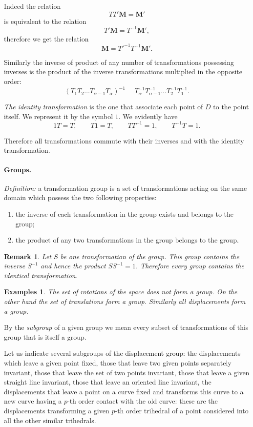 \documentclass[leqno,11pt]{book}
\numberwithin{equation}{chapter}
\theoremstyle{shape1}
\theoremstyle{shapesmall}
\newtheorem*{exs}{Examples}
\newtheorem*{rmk}{Remark}
\newenvironment{jsmall}{\vspace{9pt}\small}{\vspace{0pt}}
\begin{document}
Indeed the relation
\[
TT'\mathbf{M}=\mathbf{M}'
\]
is equivalent to the relation
\[
T'\mathbf{M}=T^{-1}\mathbf{M}',
\]
therefore we get the relation
\[
\mathbf{M}=T'^{-1}T^{-1}\mathbf{M}'.
\]

Similarly the inverse of product of any number of transformations possessing inverses is the product of the inverse transformations multiplied in the opposite order:
\[
(T_{1}T_{2}\dots T_{\alpha-1}T_{\alpha})^{-1}=T_{\alpha}^{-1}T_{\alpha-1}^{-1}\dots T_{2}^{-1}T_{1}^{-1}.
\]

\emph{The identity transformation} is the one that associate each point of $D$ to the point itself. We represent it by the symbol $1$. We evidently have
\[
1T=T,\qquad T1=T,\qquad TT^{-1}=1,\qquad T^{-1}T=1.
\]

{\small Therefore all transformations commute with their inverses and with the identity transformation.}


\paragraph{Groups.}
\label{sec:59}
\emph{Definition:} a transformation group is a set of transformations acting on the same domain which possess the two following properties:
\begin{enumerate}
\item the inverse of each transformation in the group exists and belongs to the group;
\item the product of any two transformations in the group belongs to the group.
\end{enumerate}

\begin{rmk}
  Let $S$ be one transformation of the group. This group contains the inverse $S^{-1}$ and hence the product $SS^{-1}=1$. Therefore every group contains the identical transformation.
\end{rmk}
\begin{exs}
  The set of rotations of the space does not form a group. On the other hand the set of translations form a group. Similarly all displacements form a group.
\end{exs}

By the \emph{subgroup} of a given group we mean every subset of transformations of this group that is itself a group.

\begin{jsmall}
  Let us indicate several subgroups of the displacement group: the displacements which leave a given point fixed, those that leave two given points separately invariant, those that leave the set of two points invariant, those that leave a given straight line invariant, those that leave an oriented line invariant, the displacements that leave a point on a curve fixed and transforms this curve to a new curve having a $p$-th order contact with the old curve: these are the displacements transforming a given $p$-th order trihedral of a point considered into all the other similar trihedrals. 
\end{jsmall}
\end{document}
